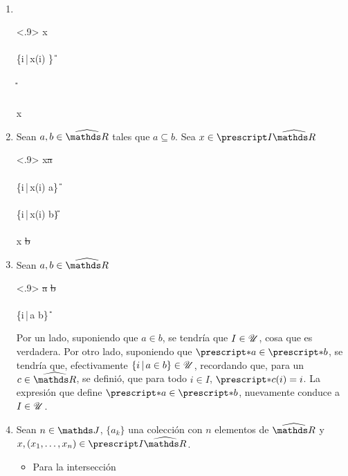 \begin{demo}~
  \begin{enumerate}
    \item~
          \begin{longderivation}<.9>
              { x\in\st{\varnothing} }\\
            \equiv\\
              { \{i\,|\,x(i) \in \varnothing\} \in\U }\\
            \equiv\\
              { \varnothing \in \U }\\
            \equiv\\
              { x\in\varnothing }
          \end{longderivation}
    \item Sean $a,b\in\Rh$ tales que $a\subseteq b$. Sea $x\in\IRh$
          \begin{longderivation}<.9>
              { x\in\st{a} }\\
            \equiv\\
              { \{i\,|\,x(i) \in a\} \in\U}\\
            \\
              { \{i\,|\,x(i) \in b\}\in\U }\\
            \equiv\\
              { x \in \st{b} }
          \end{longderivation}
    \item Sean $a,b\in\Rh$
          \begin{longderivation}<.9>
              { \st{a} \in \st{b} }\\
            \equiv\\
              { \{i\,|\,a \in b\} \in \U }
          \end{longderivation}
          Por un lado, suponiendo que $a\in b$, se tendría que $I\in\mathscr{U}$,
          cosa que es verdadera. Por otro lado, suponiendo que $\st{a} \in \st{b}$,
          se tendría que, efectivamente $\{i\,|\,a \in b\}\in\mathscr{U}$, recordando que,
          para un $c\in\Rh$, se definió, que para todo $i\in I$, $\st{c}(i) = i$.
          La expresión que define $\st{a} \in \st{b}$, nuevamente conduce a $I\in\mathscr{U}$.
    \item Sean $n\in\J$, $\{a_k\}$ una colección con $n$ elementos de
          $\Rh$ y $x, (x_1,\dots,x_n)\in\IRh$.
          \begin{itemize}
            \item Para la intersección
            

\end{itemize}
\end{enumerate}
\end{demo}

